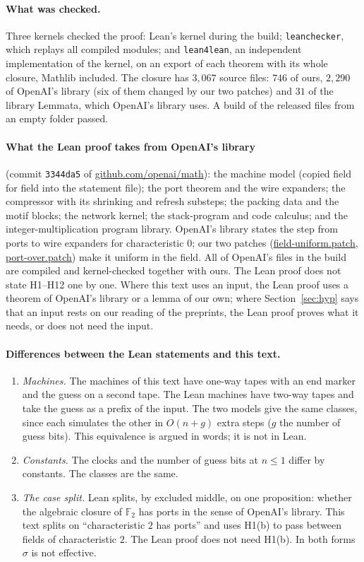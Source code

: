 \documentclass[11pt]{article}
\theoremstyle{definition}
\theoremstyle{remark}
\newcommand{\F}{\mathbb F}
\newcommand{\src}[1]{\url{#1}}
\begin{document}
\paragraph{What was checked.} Three kernels checked the proof: Lean's kernel during the build; \texttt{leanchecker}, which
replays all compiled modules; and \texttt{lean4lean}, an independent implementation of the kernel, on an export of each theorem
with its whole closure, Mathlib included. The closure has $3{,}067$ source files: $746$ of ours, $2{,}290$ of OpenAI's library
(six of them changed by our two patches) and $31$ of the library Lemmata, which OpenAI's library uses. A build of the released
files from an empty folder passed.

\paragraph{What the Lean proof takes from OpenAI's library} (commit \texttt{3344da5} of \src{github.com/openai/math}): the machine
model (copied field for field into the statement file); the port theorem and the wire expanders; the compressor with its
shrinking and refresh substeps; the packing data and the motif blocks; the network kernel; the stack-program and code calculus;
and the integer-multiplication program library. OpenAI's library states the step from ports to wire expanders for
characteristic $0$; our two patches (\src{field-uniform.patch}, \src{port-over.patch}) make it uniform in the field. All of
OpenAI's files in the build are compiled and kernel-checked together with ours. The Lean proof does not state H1--H12 one by
one. Where this text uses an input, the Lean proof uses a theorem of OpenAI's library or a lemma of our own; where
Section~\ref{sec:hyp} says that an input rests on our reading of the preprints, the Lean proof proves what it needs, or does not
need the input.

\paragraph{Differences between the Lean statements and this text.}
\begin{enumerate}
\item \emph{Machines.} The machines of this text have one-way tapes with an end marker and the guess on a second tape. The Lean
  machines have two-way tapes and take the guess as a prefix of the input. The two models give the same classes, since each
  simulates the other in $O(n+g)$ extra steps ($g$ the number of guess bits). This equivalence is argued in words; it is not in
  Lean.
\item \emph{Constants.} The clocks and the number of guess bits at $n\le1$ differ by constants. The classes are the same.
\item \emph{The case split.} Lean splits, by excluded middle, on one proposition: whether the algebraic closure of $\F_2$ has
  ports in the sense of OpenAI's library. This text splits on ``characteristic $2$ has ports'' and uses H1(b) to pass between
  fields of characteristic $2$. The Lean proof does not need H1(b). In both forms $\sigma$ is not effective.
\end{enumerate}
\end{document}
